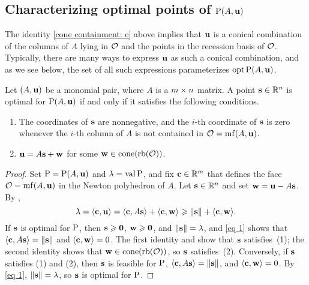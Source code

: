 \documentclass[11pt]{amsart}
\begin{document}
\subsection{Characterizing optimal points of $\mathrm{P}(A,\mathbf{u})$}

The identity \eqref{cone containment: e} above implies that
$\mathbf{u}$ is a conical combination of the columns of $A$ lying in $\mathcal{O}$ and the points in the recession basis of $\mathcal{O}$.
Typically, there are many ways to express $\mathbf{u}$ as such a conical combination, and as we see below, the set of all such expressions parameterizes  $\operatorname{opt} \mathrm{P}(A, \mathbf{u})$.

\begin{proposition}\label{opt set: P}
   Let $(A,\mathbf{u})$ be a monomial pair, where $A$ is a $m\times n$ matrix.
   A point $\mathbf{s} \in \mathbb{R}^n$ is optimal for $\mathrm{P}(A, \mathbf{u})$ if and only if it satisfies the following conditions.
\begin{enumerate}
\item  \label{mc coords: e} The coordinates of $\mathbf{s}$ are nonnegative, and the $i$-th coordinate of $\mathbf{s}$ is zero whenever the $i$-th column of $A$ is not contained in $\mathcal{O} = \operatorname{mf}(A, \mathbf{u})$.
\item  \label{mc decomposition: e} $\mathbf{u} = A \mathbf{s} + \mathbf{w}$ for some $\mathbf{w} \in  \operatorname{cone}(\operatorname{rb}(\mathcal{O}))$.
\end{enumerate}
\end{proposition}

\begin{proof}
   Set $\mathrm{P} = \mathrm{P}(A, \mathbf{u})$ and $\lambda = \operatorname{val} \mathrm{P} $, and fix $\mathbf{c} \in \mathbb{R}^m$ that defines the face $\mathcal{O} = \operatorname{mf}(A, \mathbf{u})$ in the Newton polyhedron of $A$.
   Let $\mathbf{s} \in \mathbb{R}^n$ and set $\mathbf{w} = \mathbf{u} - A\mathbf{s}$.
   By ,
   \begin{equation}\label{eq 1}
      \lambda = \langle \mathbf{c}, \mathbf{u} \rangle = \langle \mathbf{c}, A \mathbf{s} \rangle + \langle \mathbf{c}, \mathbf{w} \rangle \geqslant \| \mathbf{s} \| + \langle \mathbf{c}, \mathbf{w} \rangle.
   \end{equation}
   If $\mathbf{s}$ is optimal for $\mathrm{P}$, then $\mathbf{s} \geqslant \mathbf{0}$, $\mathbf{w} \geqslant \mathbf{0}$, and $\| \mathbf{s} \| = \lambda$, and \eqref{eq 1} shows that $\langle \mathbf{c}, A \mathbf{s} \rangle = \| \mathbf{s} \|$ and $\langle \mathbf{c}, \mathbf{w} \rangle = 0$.
   The first identity and  show that $\mathbf{s}$ satisfies~(1); the second identity shows that $\mathbf{w}\in \operatorname{cone}(\operatorname{rb}(\mathcal{O}))$, so $\mathbf{s}$ satisfies~(2).
   Conversely, if $\mathbf{s}$ satisfies (1) and (2), then $\mathbf{s}$ is feasible for $\mathrm{P}$, $\langle \mathbf{c}, A \mathbf{s} \rangle = \| \mathbf{s} \|$, and $\langle \mathbf{c}, \mathbf{w} \rangle = 0$.
   By \eqref{eq 1}, $\| \mathbf{s} \| = \lambda$, so $\mathbf{s}$ is optimal for $\mathrm{P}$.
\end{proof}
\end{document}
